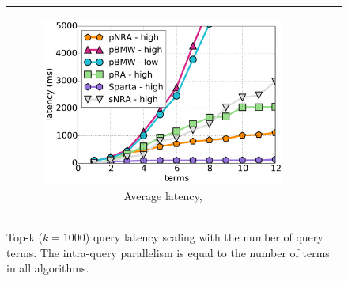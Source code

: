 \begin{figure}[tbh]
\begin{tabular}{ccc}
    \begin{subfigure}[t]{0.3\textwidth}
    \includegraphics[width=\textwidth]{figures/latency_12threads_cluewebX10.pdf}
	\caption{Average latency, \cwten}
    \end{subfigure}  
\end{tabular}
\caption{Top-k ($k=1000$) query latency scaling with the number of query terms. 
The intra-query parallelism is equal to the number of terms in all algorithms. }
\label{fig:terms-scaling}
\end{figure}



